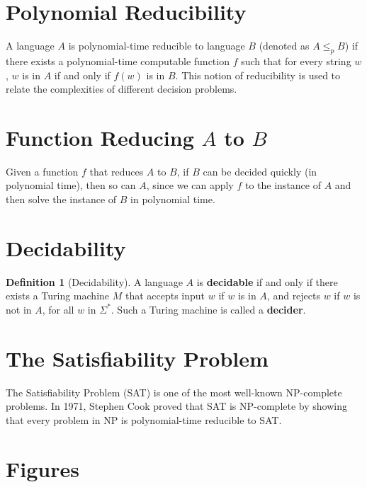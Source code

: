 \documentclass[12pt,openany]{book}
\theoremstyle{definition}
\newtheorem{definition}{Definition}[chapter]
\begin{document}
\section{Polynomial Reducibility}
A language \( A \) is polynomial-time reducible to language \( B \) (denoted as \( A \leq_p B \)) if there exists a polynomial-time computable function \( f \) such that for every string \( w \), \( w \) is in \( A \) if and only if \( f(w) \) is in \( B \). This notion of reducibility is used to relate the complexities of different decision problems.

\section{Function Reducing \( A \) to \( B \)}
Given a function \( f \) that reduces \( A \) to \( B \), if \( B \) can be decided quickly (in polynomial time), then so can \( A \), since we can apply \( f \) to the instance of \( A \) and then solve the instance of \( B \) in polynomial time.

\section{Decidability}
\begin{definition}[Decidability]
	A language \( A \) is \textbf{decidable} if and only if there exists a Turing machine \( M \) that accepts input \( w \) if \( w \) is in \( A \), and rejects \( w \) if \( w \) is not in \( A \), for all \( w \) in \( \Sigma^* \). Such a Turing machine is called a \textbf{decider}.
\end{definition}

\section{The Satisfiability Problem}
The Satisfiability Problem (SAT) is one of the most well-known NP-complete problems. In 1971, Stephen Cook proved that SAT is NP-complete by showing that every problem in NP is polynomial-time reducible to SAT.

\section{Figures}

	
	\newpage
\end{document}
